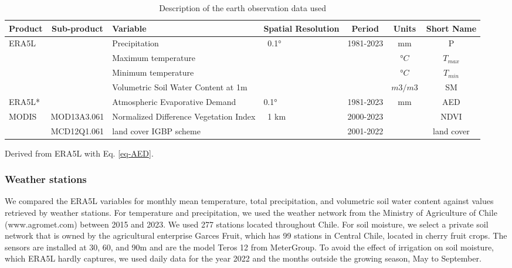 \documentclass[
  authoryear,
  preprint,
  3p,
  onecolumn]{elsarticle}
\begin{document}
\begin{table}[!ht]
\caption{Description of the earth observation data used }
\label{tab-desEOD}
\small
\centering
\begin{tabular}{p{}cp{}p{}ccc}
\hline
\multirow{1}{*}{\centering Product} & Sub-product & Variable & Spatial Resolution  & Period & Units & Short Name \\ 
\hline
\multirow{4}{*}{ERA5L} & ~ & Precipitation & \multirow{4}{*}{~0.1°} & \multirow{4}{*}{1981-2023} & mm & P \\ 
         &  & Maximum temperature & ~ & & $°C$ & $T_{max}$ \\ 
         &  & Minimum temperature & ~ & & $°C$ & $T_{min}$ \\ 
         &  & Volumetric Soil Water Content at 1m & ~ & & $m3/m3$ & SM \\ 
ERA5L* & & Atmospheric Evaporative Demand & 0.1° & 1981-2023 & mm & AED \\
        \multirow{2}{*}{MODIS} & MOD13A3.061 & Normalized Difference Vegetation Index & \multirow{2}{*}{~1 km} & 2000-2023 & ~ & NDVI \\ 
         & MCD12Q1.061 & land cover IGBP scheme & & 2001-2022 & ~ & land cover \\ 
\hline
\end{tabular}
{\raggedright *Derived from ERA5L with Eq. \ref{eq-AED}. \par}
\end{table}

\hypertarget{weather-stations}{%
\subsubsection{Weather stations}\label{weather-stations}}

We compared the ERA5L variables for monthly mean temperature, total
precipitation, and volumetric soil water content against values
retrieved by weather stations. For temperature and precipitation, we
used the weather network from the Ministry of Agriculture of Chile
(www.agromet.com) between 2015 and 2023. We used 277 stations located
throughout Chile. For soil moisture, we select a private soil network
that is owned by the agricultural enterprise Garces Fruit, which has 99
stations in Central Chile, located in cherry fruit crops. The sensors
are installed at 30, 60, and 90m and are the model Teros 12 from
MeterGroup. To avoid the effect of irrigation on soil moisture, which
ERA5L hardly captures, we used daily data for the year 2022 and the
months outside the growing season, May to September.
\end{document}
